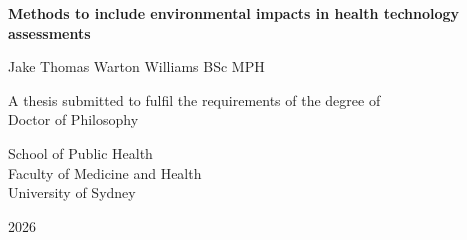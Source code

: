 \begin{titlepage}
   \begin{center}

        \vspace*{2cm}
        
       \begin{Large}
       \textbf{Methods to include environmental impacts in health technology assessments}\par
       \end{Large}
            
       \vfill

       Jake Thomas Warton Williams BSc MPH

       \vfill
            
       A thesis submitted to fulfil the requirements of the degree of\\Doctor of Philosophy  
       
       \vfill
     

            
       School of Public Health\\
       Faculty of Medicine and Health\\
       University of Sydney

        \vfill

       2026
       
       \vspace*{2cm}

   \end{center}
\end{titlepage}